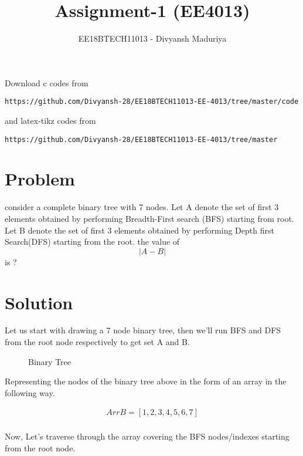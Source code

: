 \documentclass[journal,12pt,twocolumn]{IEEEtran}
\begin{document}
\title{Assignment-1 (EE4013)}
\author{EE18BTECH11013 - Divyansh Maduriya}
\maketitle
\newpage
\bigskip
\renewcommand{\thefigure}{\theenumi}
\renewcommand{\thetable}{\theenumi}
Download c codes from 
\begin{lstlisting}
https://github.com/Divyansh-28/EE18BTECH11013-EE-4013/tree/master/code
\end{lstlisting}
%
and latex-tikz codes from 
%
\begin{lstlisting}
https://github.com/Divyansh-28/EE18BTECH11013-EE-4013/tree/master
\end{lstlisting}
\section{Problem}


	consider a complete binary tree with 7 nodes. Let A denote the set of first 3 elements obtained by performing Breadth-First search (BFS) starting from root. Let B denote the set of first 3 elements obtained by performing Depth first Search(DFS) starting from the root. 
	the value of$$|A-B|$$ is ?
	
\section{Solution}

Let us start with drawing a 7 node binary tree, then we'll run BFS and DFS from the root node respectively to get set A and B.


\begin{figure}[!h]
\centering
{}
\caption{Binary Tree} \label{fig:M1}
\end{figure}

Representing the nodes of the binary tree above in the form of an array in the following way.

\begin{align}
   Arr B = [1,2,3,4,5,6,7]
\end{align}\\
Now, Let's traverse through the array
covering the BFS nodes/indexes starting from the root node.
\end{document}
